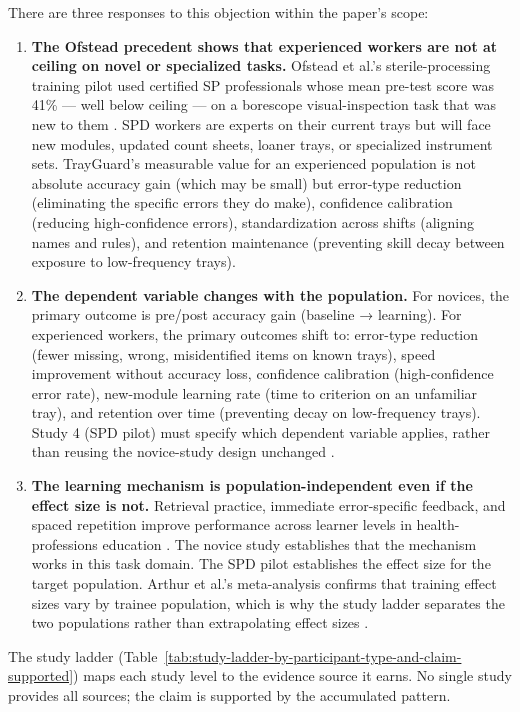 \documentclass[10pt,a4paper]{article}
\begin{document}
There are three responses to this objection within the paper's scope:
\begin{enumerate}
  \item \textbf{The Ofstead precedent shows that experienced workers are not at
  ceiling on novel or specialized tasks.} Ofstead et al.'s sterile-processing
  training pilot used certified SP professionals whose mean pre-test score was
  41\% — well below ceiling — on a borescope visual-inspection task that was
  new to them \cite{ofstead-et-al-2023}. SPD workers are experts on their
  current trays but will face new modules, updated count sheets, loaner trays,
  or specialized instrument sets. TrayGuard's measurable value for an
  experienced population is not absolute accuracy gain (which may be small)
  but error-type reduction (eliminating the specific errors they do make),
  confidence calibration (reducing high-confidence errors), standardization
  across shifts (aligning names and rules), and retention maintenance
  (preventing skill decay between exposure to low-frequency trays).
  \item \textbf{The dependent variable changes with the population.} For
  novices, the primary outcome is pre/post accuracy gain (baseline → learning).
  For experienced workers, the primary outcomes shift to: error-type reduction
  (fewer missing, wrong, misidentified items on known trays), speed improvement
  without accuracy loss, confidence calibration (high-confidence error rate),
  new-module learning rate (time to criterion on an unfamiliar tray), and
  retention over time (preventing decay on low-frequency trays). Study 4 (SPD
  pilot) must specify which dependent variable applies, rather than
  reusing the novice-study design unchanged \cite{kirkpatrick-evaluation-1994}.
  \item \textbf{The learning mechanism is population-independent even if the
  effect size is not.} Retrieval practice, immediate error-specific feedback,
  and spaced repetition improve performance across learner levels in
  health-professions education
  \cite{roediger-and-karpicke-2006, dunlosky-et-al-2013, larsen-et-al-2009}.
  The novice study establishes that the mechanism works in this task domain.
  The SPD pilot establishes the effect size for the target population. Arthur
  et al.'s meta-analysis confirms that training effect sizes vary by trainee
  population, which is why the study ladder separates the two populations
  rather than extrapolating effect sizes \cite{arthur-et-al-2003}.
\end{enumerate}
The study ladder (Table~\ref{tab:study-ladder-by-participant-type-and-claim-supported})
maps each study level to the evidence source it earns. No single study provides
all sources; the claim is supported by the accumulated pattern.
\end{document}
